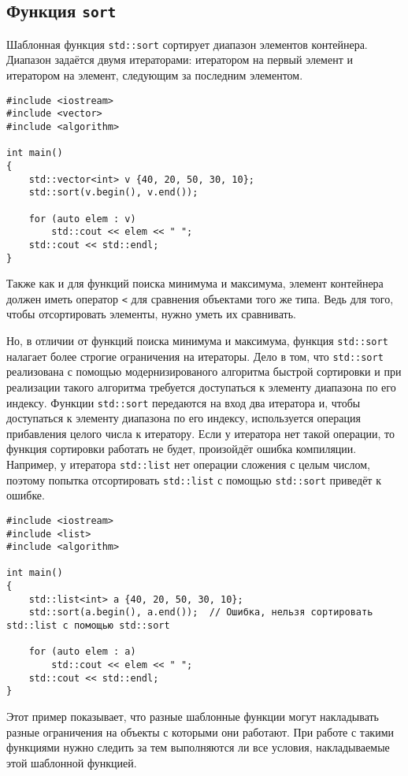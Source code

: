 \documentclass{article}
\begin{document}
\subsection*{Функция \texttt{sort}}
Шаблонная функция \texttt{std::sort} сортирует диапазон элементов контейнера. Диапазон задаётся двумя итераторами: итератором на первый элемент и итератором на элемент, следующим за последним элементом.
\begin{lstlisting}
#include <iostream>
#include <vector>
#include <algorithm>

int main()
{
	std::vector<int> v {40, 20, 50, 30, 10};
	std::sort(v.begin(), v.end());
	
	for (auto elem : v)
		std::cout << elem << " ";
	std::cout << std::endl;
}
\end{lstlisting}
Также как и для функций поиска минимума и максимума, элемент контейнера должен иметь оператор \texttt{<} для сравнения объектами того же типа. Ведь для того, чтобы отсортировать элементы, нужно уметь их сравнивать.

Но, в отличии от функций поиска минимума и максимума, функция \texttt{std::sort} налагает более строгие ограничения на итераторы. Дело в том, что \texttt{std::sort} реализована с помощью модернизированого алгоритма быстрой сортировки и при реализации такого алгоритма требуется доступаться к элементу диапазона по его индексу. Функции \texttt{std::sort} передаются на вход два итератора и, чтобы доступаться к элементу диапазона по его индексу,  используется операция прибавления целого числа к итератору. Если у итератора нет такой операции, то функция сортировки работать не будет, произойдёт ошибка компиляции. Например, у итератора \texttt{std::list} нет операции сложения с целым числом, поэтому попытка отсортировать \texttt{std::list} с помощью \texttt{std::sort} приведёт к ошибке.
\begin{lstlisting}
#include <iostream>
#include <list>
#include <algorithm>

int main()
{
	std::list<int> a {40, 20, 50, 30, 10};
	std::sort(a.begin(), a.end());  // Ошибка, нельзя сортировать std::list с помощью std::sort
	
	for (auto elem : a)
		std::cout << elem << " ";
	std::cout << std::endl;
}
\end{lstlisting}
Этот пример показывает, что разные шаблонные функции могут накладывать разные ограничения на объекты с которыми они работают. При работе с такими функциями нужно следить за тем выполняются ли все условия, накладываемые этой шаблонной функцией.
\end{document}
